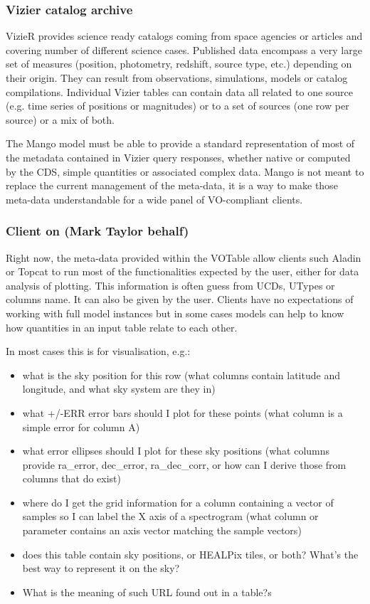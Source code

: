 \documentclass[11pt,a4paper]{ivoa}
\begin{document}
\subsubsection{Vizier catalog archive}
VizieR provides science ready catalogs coming from space agencies or articles and covering number of
different science cases.
Published data encompass a very large set of measures (position, photometry, redshift, source type, etc.)
depending on their origin.
They can result from  observations, simulations, models or catalog compilations.
Individual Vizier tables can contain data all related to one source (e.g. time series of positions or magnitudes) or to a set of sources (one row per source) or a mix of both.

The Mango model must be able to provide a standard representation of most of the metadata contained 
in Vizier query responses, whether native or computed  by the CDS,
simple quantities or associated complex data.
Mango is not meant to replace the current management of the meta-data,
it is a way to make those meta-data understandable for a wide panel of VO-compliant clients.

\subsubsection{Client on (Mark Taylor behalf)}
Right now, the meta-data provided within the VOTable allow clients such Aladin or Topcat to run most 
of the functionalities expected by the user, either for data analysis of plotting.
This information is often guess from UCDs, UTypes or columns name. It can also be given by the user.
Clients have no expectations of working with full model instances but in some cases models 
can help to know how quantities in an input table relate to each other.

In most cases this is for visualisation, e.g.:
\begin{itemize}
    \item what is the sky position for this row
    (what columns contain latitude and longitude, and what sky system are they in)

     \item what +/-ERR error bars should I plot for these points
    (what column is a simple error for column A)

    \item what error ellipses should I plot for these sky positions
    (what columns provide ra\_error, dec\_error, ra\_dec\_corr,
     or how can I derive those from columns that do exist)

    \item where do I get the grid information for a column containing
    a vector of samples so I can label the X axis of a spectrogram
    (what column or parameter contains an axis vector matching
     the sample vectors)

    \item does this table contain sky positions, or HEALPix tiles, or both?
    What's the best way to represent it on the sky?

    \item What is the meaning of such URL found out in a table?s
\end{itemize}
\end{document}
